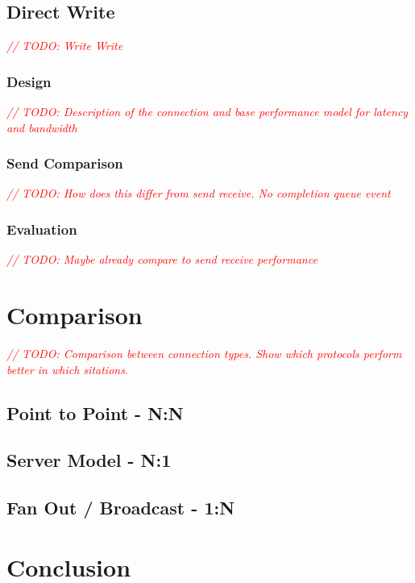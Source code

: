 \documentclass{article}
\newcommand{\todo}[1]{\textit{\textcolor{red}{// TODO: #1} }}
\theoremstyle{plain}
\theoremstyle{definition}
\theoremstyle{remark}
\begin{document}
\pagebreak
\subsection{Direct Write}
\todo{Write Write}
\subsubsection{Design}
\todo{Description of the connection and base performance model for latency and bandwidth}
\subsubsection{Send Comparison}
\todo{How does this differ from send receive. No completion queue event}
\subsubsection{Evaluation}
\todo{Maybe already compare to send receive performance}

\pagebreak


\pagebreak



\pagebreak
\section{Comparison}
\todo{Comparison between connection types. Show which protocols perform better in which sitations.}

\subsection{Point to Point - N:N}

\subsection{Server Model - N:1}

\subsection{Fan Out / Broadcast - 1:N}

\pagebreak
\section{Conclusion}



\pagebreak


{}
\end{document}

